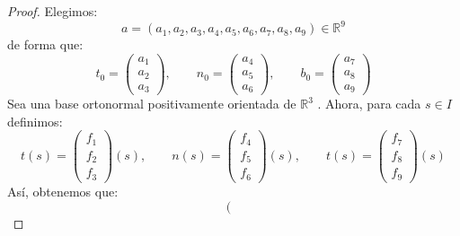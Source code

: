 \begin{teo}
\begin{proof}
        \noindent
        Elegimos:
        \begin{equation*}
            a = (a_1, a_2, a_3, a_4, a_5, a_6, a_7, a_8, a_9) \in \mathbb{R}^9
        \end{equation*}
        de forma que:
        \begin{equation*}
            t_0 = \left(\begin{array}{ccc}
                a_1 \\
                a_2 \\
                a_3 
            \end{array}\right), \qquad
            n_0 = \left(\begin{array}{ccc}
                a_4 \\
                a_5 \\
                a_6 
            \end{array}\right)
            ,\qquad b_0 = \left(\begin{array}{ccc}
                a_7 \\
                a_8 \\
                a_9 
            \end{array}\right)
        \end{equation*}
        Sea una base ortonormal positivamente orientada de $\mathbb{R}^3$ . Ahora, para cada $s\in I$ definimos:
        \begin{equation*}
            t(s) = \left(\begin{array}{ccc}
                f_1\\
                f_2\\
                f_3
            \end{array}\right)(s), \qquad n(s) = \left(\begin{array}{ccc}
                f_4 \\
                f_5 \\
                f_6 
            \end{array}\right)(s), \qquad t(s) = \left(\begin{array}{ccc}
                f_7 \\
                f_8 \\
                f_9 
            \end{array}\right)(s)
        \end{equation*}
        Así, obtenemos que:
        \begin{equation*}
            \boxed{\left(\begin{array}{ccc}

\end{array}}
\end{equation*}
\end{proof}
\end{teo}
